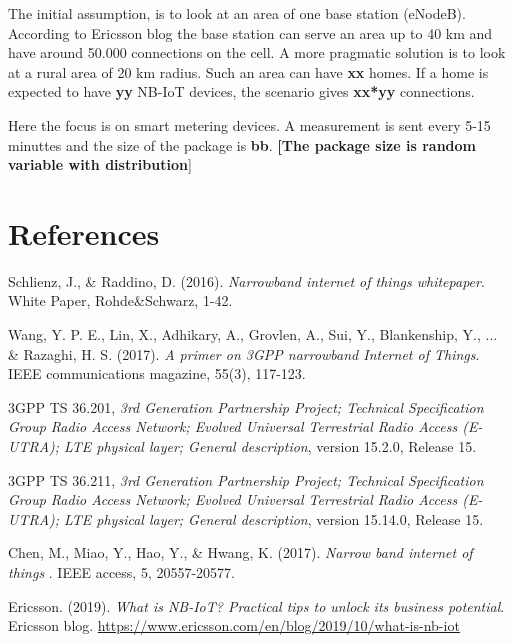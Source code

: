 \documentclass[10pt,a4paper,titlepage,twoside]{article}
\newcommand{\note}[1]{\textbf{[\color{ymablue}#1}]}
\newcommand{\hh}[1]{\textbf{\color{ymaorng} #1}}
\begin{document}
The initial assumption, is to look at an area of one base station (eNodeB). According to Ericsson blog \cite{lme_web1} the base station can serve an area up to 40 km and have around 50.000 connections on the cell. A more pragmatic solution is to look at a rural area of 20 km radius. Such an area can have \hh{xx} homes. If a home is expected to have \hh{yy} NB-IoT devices, the scenario gives \hh{xx*yy} connections.

Here the focus is on smart metering devices. A measurement is sent every 5-15 minuttes and the size of the package is \hh{bb}. \note{The package size is random variable with \?\? distribution}




\clearpage
\section{References}

\begin{thebibliography}{4}
Schlienz, J., \& Raddino, D. (2016).
\textit{Narrowband internet of things whitepaper}. White Paper, Rohde\&Schwarz, 1-42.

Wang, Y. P. E., Lin, X., Adhikary, A., Grovlen, A., Sui, Y., Blankenship, Y., ... \& Razaghi, H. S. (2017).
\textit{A primer on 3GPP narrowband Internet of Things}. IEEE communications magazine, 55(3), 117-123.

3GPP TS 36.201,
\textit{3rd Generation Partnership Project; Technical Specification Group Radio Access Network; Evolved Universal Terrestrial Radio Access (E-UTRA); LTE physical layer; General description}, version 15.2.0, Release 15.

3GPP TS 36.211,
\textit{3rd Generation Partnership Project; Technical Specification Group Radio Access Network; Evolved Universal Terrestrial Radio Access (E-UTRA); LTE physical layer; General description}, version 15.14.0, Release 15.

Chen, M., Miao, Y., Hao, Y., \& Hwang, K. (2017).
\textit{Narrow band internet of things}
. IEEE access, 5, 20557-20577.

Ericsson. (2019).
\textit{What is NB-IoT? Practical tips to unlock its business potential}.
Ericsson blog.
\url{https://www.ericsson.com/en/blog/2019/10/what-is-nb-iot}

\end{thebibliography}
\end{document}
